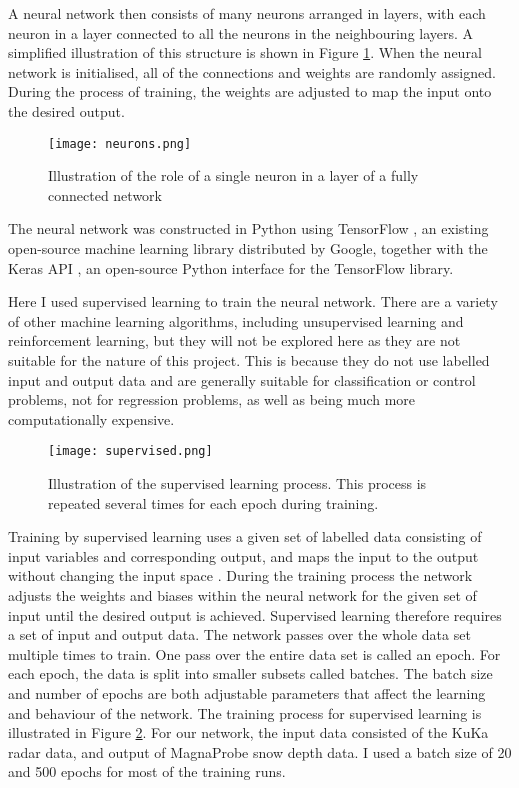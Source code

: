 \documentclass[11pt, a4paper]{article}
\begin{document}
A neural network then consists of many neurons arranged in layers, with each neuron in a layer connected to all  the neurons in the neighbouring layers. A simplified illustration of this structure is shown in Figure \ref{fig:net}. When the neural network is initialised,  all of the connections and weights are randomly assigned. During the process of training, the weights are adjusted to map the input onto the desired output.

\begin{figure}[H]
\centering
   		 \texttt{[image: neurons.png]}
    		\caption{Illustration of the role of a single neuron in a layer of a fully connected network}
	\label{fig:net}
\end{figure}

The neural network was constructed in Python using TensorFlow \cite{tf}, an existing open-source machine learning library distributed by Google, together with the Keras API \cite {keras}, an open-source Python interface for the TensorFlow library.  

Here I used supervised learning to train the neural network. There are a variety of other machine learning algorithms, including unsupervised learning and reinforcement learning, but they will not be explored here as they are not suitable for the nature of this project.  This is because they do not use labelled input and output data and are generally suitable for classification or control problems, not for regression problems, as well as being much more computationally expensive.

\begin{figure}[H]
\centering
		\texttt{[image: supervised.png]}
		\caption{Illustration of the supervised learning process.  This process is repeated several times for each epoch during training.}
	\label{fig:SL}
\end{figure}

Training by supervised learning uses a given set of labelled data consisting of input variables and corresponding output, and maps the input to the output without changing the input space \cite{SL}. During the training process the network adjusts the weights and biases within the neural network for the given set of input until the desired output is achieved. Supervised learning therefore requires a set of input and output data.  The network passes over the whole data set multiple times to train. One pass over the entire data set is called an epoch.  For each epoch, the data is split into smaller subsets called batches. The batch size and number of epochs are both adjustable parameters that affect the learning and behaviour of the network. The training process for supervised learning is illustrated in Figure \ref{fig:SL}.  For our network, the input data consisted of the KuKa radar data, and output of MagnaProbe snow depth data.  I used a batch size of 20 and 500 epochs for most of the training runs. 
\end{document}
